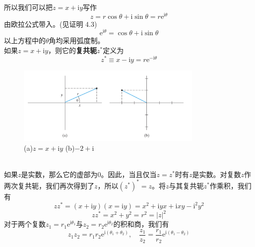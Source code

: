 	所以我们可以把$z = x+ \mathrm{i}y$写作
	\begin{equation}
		z = r \cos \theta + \mathrm{i} \sin \theta = r \mathrm{e}^{\mathrm{i} \theta}
		\label{eq:1.27 Triangular forms of complex numbers}
	\end{equation}	
	由欧拉公式带入。(见证明 4.3)
	\begin{equation}
		\boxed{\mathrm{e}^{\mathrm{i}\theta} = \cos \theta + \mathrm{i} \sin\theta}
		\label{eq:1.28 Euler's equation}
	\end{equation}
	以上方程中的$\theta$角均采用弧度制。\\
	\indent 如果$z = x + \mathrm{i}y$，则它的\textbf{复共轭}$z^{\ast}$定义为
	\begin{equation}
		z^{\ast} \equiv x - \mathrm{i}y = r \mathrm{e} ^{-\mathrm{i}\theta}
		\label{eq:1.29 definition of complexconjugate}
	\end{equation}
		\begin{figure}[h!]
		\centering
		\includegraphics[width=0.8\textwidth]{Figures/1.3.png}  %
		\caption{(a)$z = x + \mathrm{i}y$  (b)$-2+\mathrm{i}$}
		\label{fig:1.3}
	\end{figure}\\
	\indent 如果$z$是实数，那么它的虚部为0。因此，当且仅当$z = z^{\ast}$时有$z$是实数。对复数$z$作两次复共轭，我们再次得到了$z$，所以$\left(z^{\ast}\right)^{\ast}=z$。将$z$与其复共轭$z^{\ast}$作乘积，我们有
	\begin{equation*}
		zz^{\ast} = \left(x + \mathrm{i}y\right)\left(x= \mathrm{i}y\right) = x^2+\mathrm{i}yx+\mathrm{i}xy-\mathrm{i}^2y^2
	\end{equation*}
	\begin{equation}
		\boxed{zz^{\ast} = x^2+y^2=r^2=\left|z\right|^2}
		\label{eq:1.30 product of z and its complex conjugate}
	\end{equation}
	对于两个复数$z_1=r_1\mathrm{e}^{\mathrm{i}\theta_1}$与$z_2 = r_2\mathrm{e}^{\mathrm{i}\theta_2}$的积和商，我们有
	\begin{equation}
		z_1z_2 = r_1r_2\mathrm{e}^{\mathrm{i}\left(\theta_1+\theta_2\right)}, \quad \frac{z_1}{z_2} = \frac{r_1}{r_2}\mathrm{e}^{\mathrm{i} \left(\theta_1 - \theta_2\right)}
		\label{eq:1.31 product and quotient of two complex numbers}
	\end{equation}
